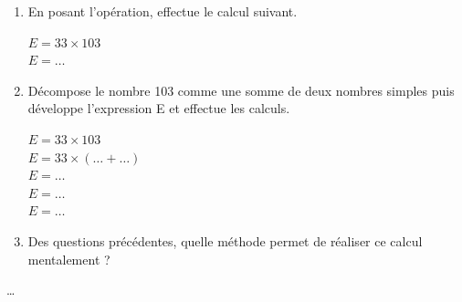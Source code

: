 \begin{exercice*}
    \begin{enumerate}
        \item En posant l'opération, effectue le calcul suivant.

        $E = 33 \times 103$ \\
        $E = \dots$

        \item Décompose le nombre 103 comme une somme de deux nombres simples puis développe l'expression E et effectue les calculs.

        $E = 33 \times 103$ \\
        $E = 33 \times (\dots + \dots)$ \\
        $E = \dots$ \\
        $E = \dots$ \\
        $E = \dots$

        \item Des questions précédentes, quelle méthode permet de réaliser ce calcul mentalement ?
    \end{enumerate}
\end{exercice*}
\begin{corrige}
    \dots
\end{corrige}

